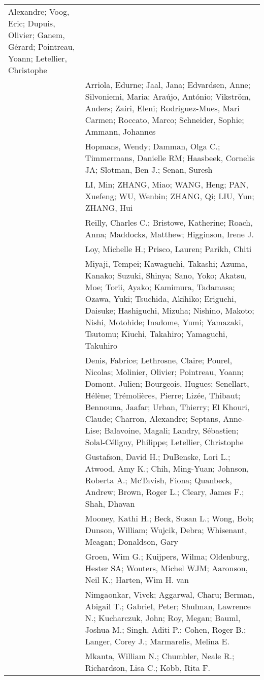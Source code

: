 \documentclass[
]{article}
\begin{document}
\begin{longtable}[]{@{}
  >{\raggedleft\arraybackslash}p{}
  >{\raggedright\arraybackslash}p{}@{}}
Alexandre; Voog, Eric; Dupuis, Olivier; Ganem, Gérard; Pointreau, Yoann;
Letellier, Christophe \\
15 & Arriola, Edurne; Jaal, Jana; Edvardsen, Anne; Silvoniemi, Maria;
Araújo, António; Vikström, Anders; Zairi, Eleni; Rodriguez-Mues, Mari
Carmen; Roccato, Marco; Schneider, Sophie; Ammann, Johannes \\
16 & Hopmans, Wendy; Damman, Olga C.; Timmermans, Danielle RM; Haasbeek,
Cornelis JA; Slotman, Ben J.; Senan, Suresh \\
17 & LI, Min; ZHANG, Miao; WANG, Heng; PAN, Xuefeng; WU, Wenbin; ZHANG,
Qi; LIU, Yun; ZHANG, Hui \\
18 & Reilly, Charles C.; Bristowe, Katherine; Roach, Anna; Maddocks,
Matthew; Higginson, Irene J. \\
19 & Loy, Michelle H.; Prisco, Lauren; Parikh, Chiti \\
20 & Miyaji, Tempei; Kawaguchi, Takashi; Azuma, Kanako; Suzuki, Shinya;
Sano, Yoko; Akatsu, Moe; Torii, Ayako; Kamimura, Tadamasa; Ozawa, Yuki;
Tsuchida, Akihiko; Eriguchi, Daisuke; Hashiguchi, Mizuha; Nishino,
Makoto; Nishi, Motohide; Inadome, Yumi; Yamazaki, Tsutomu; Kiuchi,
Takahiro; Yamaguchi, Takuhiro \\
21 & Denis, Fabrice; Lethrosne, Claire; Pourel, Nicolas; Molinier,
Olivier; Pointreau, Yoann; Domont, Julien; Bourgeois, Hugues; Senellart,
Hélène; Trémolières, Pierre; Lizée, Thibaut; Bennouna, Jaafar; Urban,
Thierry; El Khouri, Claude; Charron, Alexandre; Septans, Anne-Lise;
Balavoine, Magali; Landry, Sébastien; Solal-Céligny, Philippe;
Letellier, Christophe \\
22 & Gustafson, David H.; DuBenske, Lori L.; Atwood, Amy K.; Chih,
Ming-Yuan; Johnson, Roberta A.; McTavish, Fiona; Quanbeck, Andrew;
Brown, Roger L.; Cleary, James F.; Shah, Dhavan \\
23 & Mooney, Kathi H.; Beck, Susan L.; Wong, Bob; Dunson, William;
Wujcik, Debra; Whisenant, Meagan; Donaldson, Gary \\
24 & Groen, Wim G.; Kuijpers, Wilma; Oldenburg, Hester SA; Wouters,
Michel WJM; Aaronson, Neil K.; Harten, Wim H. van \\
25 & Nimgaonkar, Vivek; Aggarwal, Charu; Berman, Abigail T.; Gabriel,
Peter; Shulman, Lawrence N.; Kucharczuk, John; Roy, Megan; Bauml, Joshua
M.; Singh, Aditi P.; Cohen, Roger B.; Langer, Corey J.; Marmarelis,
Melina E. \\
26 & Mkanta, William N.; Chumbler, Neale R.; Richardson, Lisa C.; Kobb,
Rita F. \\

\end{longtable}
\end{document}
